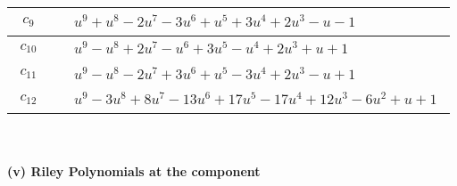\documentclass[1p]{elsarticle_modified}
\theoremstyle{definition}
\begin{document}
\begin{tabular}{m{50pt}|m{274pt}}
\hline $$\begin{aligned}c_{9}\end{aligned}$$&$\begin{aligned}
&u^9+u^8-2 u^7-3 u^6+u^5+3 u^4+2 u^3- u-1
\end{aligned}$\\
\hline $$\begin{aligned}c_{10}\end{aligned}$$&$\begin{aligned}
&u^9- u^8+2 u^7- u^6+3 u^5- u^4+2 u^3+u+1
\end{aligned}$\\
\hline $$\begin{aligned}c_{11}\end{aligned}$$&$\begin{aligned}
&u^9- u^8-2 u^7+3 u^6+u^5-3 u^4+2 u^3- u+1
\end{aligned}$\\
\hline $$\begin{aligned}c_{12}\end{aligned}$$&$\begin{aligned}
&u^9-3 u^8+8 u^7-13 u^6+17 u^5-17 u^4+12 u^3-6 u^2+u+1
\end{aligned}$\\
\hline
\end{tabular}\\~\\
\newpage\renewcommand{\arraystretch}{1}
\flushleft \textbf{(v) Riley Polynomials at the component}\newline \\
\end{document}
